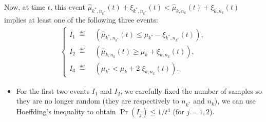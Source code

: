 \begin{smallproof}
    Now, at time $t$, this event $\widehat{\mu}_{k^*,n_{k^*}}(t) + \xi_{k^*,n_{k^*}}(t) < \widehat{\mu}_{k,n_k}(t) + \xi_{k,n_k}(t)$
    implies at least one of the following three events:
    \begin{align*}
        \begin{cases}
        I_1 \; \eqdef \; & ( \widehat{\mu}_{k^*,n_{k^*}}(t) \leq \mu_{k^*} - \xi_{k^*,n_{k^*}}(t) ), \\
        I_2 \; \eqdef \; & ( \widehat{\mu}_{k,n_k}(t) \geq \mu_k + \xi_{k,n_k}(t) ), \\
        I_3 \; \eqdef \; & ( \mu_{k^*} < \mu_k + 2 \; \xi_{k,n_k} (t) ).
        \end{cases}
    \end{align*}

    \begin{itemize}
        \item
        For the first two events $I_1$ and $I_2$, we carefully fixed the number of samples so they are no longer random (they are respectively to $n_{k^*}$ and $n_k$), we can use Hoeffding's inequality to obtain $\Pr(I_j) \leq 1 / t^{4}$ (for $j=1,2$).


\end{itemize}
\end{smallproof}
